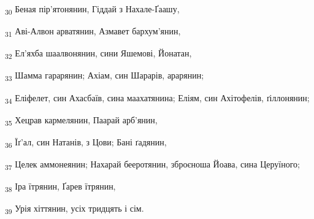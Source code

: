 \begin{tcolorbox}
\textsubscript{30} Беная пір'ятонянин, Гіддай з Нахале-Ґаашу,
\end{tcolorbox}
\begin{tcolorbox}
\textsubscript{31} Аві-Алвон арватянин, Азмавет бархум'янин,
\end{tcolorbox}
\begin{tcolorbox}
\textsubscript{32} Ел'яхба шаалвонянин, сини Яшемові, Йонатан,
\end{tcolorbox}
\begin{tcolorbox}
\textsubscript{33} Шамма гарарянин; Ахіам, син Шарарів, арарянин;
\end{tcolorbox}
\begin{tcolorbox}
\textsubscript{34} Еліфелет, син Ахасбаїв, сина маахатянина; Еліям, син Ахітофелів, ґіллонянин;
\end{tcolorbox}
\begin{tcolorbox}
\textsubscript{35} Хецрав кармелянин, Паарай арб'янин,
\end{tcolorbox}
\begin{tcolorbox}
\textsubscript{36} Їґ'ал, син Натанів, з Цови; Бані ґадянин,
\end{tcolorbox}
\begin{tcolorbox}
\textsubscript{37} Целек аммонеянин; Нахарай бееротянин, зброєноша Йоава, сина Церуїного;
\end{tcolorbox}
\begin{tcolorbox}
\textsubscript{38} Іра їтрянин, Ґарев їтрянин,
\end{tcolorbox}
\begin{tcolorbox}
\textsubscript{39} Урія хіттянин, усіх тридцять і сім.
\end{tcolorbox}
